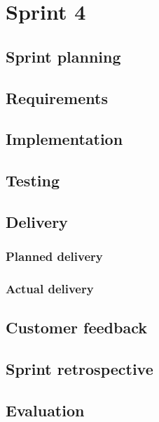 \section{Sprint 4}

\subsection{Sprint planning}
\subsection{Requirements}
\subsection{Implementation}
\subsection{Testing}
\subsection{Delivery}
\subsubsection{Planned delivery}
\subsubsection{Actual delivery}
\subsection{Customer feedback}
\subsection{Sprint retrospective}
\subsection{Evaluation}